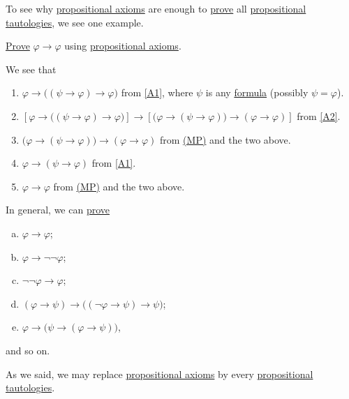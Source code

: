 To see why \hyperref[def:propositional-axioms]{propositional axioms} are enough to \hyperref[def:proof]{prove} all \hyperref[def:propositional-tautology]{propositional tautologies}, we see one example.

\begin{problem*}\label{prb:lec6}
	\hyperref[def:proof]{Prove} \(\varphi \to \varphi \) using \hyperref[def:propositional-axioms]{propositional axioms}.
\end{problem*}
\begin{answer}
	We see that
	\begin{enumerate}
		\item \(\varphi \to  \big((\psi \to \varphi ) \to \varphi \big)\) from \autoref{A1}, where \(\psi \) is any \hyperref[def:formula]{formula} (possibly \(\psi =\varphi \)).
		\item \(\left[ \varphi \to \big((\psi \to \varphi) \to \varphi \big) \right] \to  \left[ \big(\varphi \to (\psi \to \varphi )\big) \to (\varphi \to \varphi ) \right] \) from \autoref{A2}.
		\item \(\big(\varphi \to (\psi \to \varphi )\big) \to (\varphi \to \varphi )\) from \hyperref[def:rule-of-inference]{(MP)} and the two above.
		\item \(\varphi \to (\psi \to \varphi )\) from \autoref{A1}.
		\item \(\varphi \to \varphi \) from \hyperref[def:rule-of-inference]{(MP)} and the two above.
	\end{enumerate}
\end{answer}

In general, we can \hyperref[def:proof]{prove}
\begin{multicols}{2}
	\begin{enumerate}[(a)]
		\item \(\varphi \to \varphi \);
		\item \(\varphi \to \lnot \lnot \varphi \);
		\item \(\lnot \lnot \varphi \to \varphi \);
		\item \((\varphi \to \psi ) \to  \big((\lnot \varphi \to \psi ) \to \psi \big)\);
		\item \(\varphi \to \big(\psi \to (\varphi \to \psi )\big)\),
	\end{enumerate}
\end{multicols}
and so on.

\begin{note}
	As we said, we may replace \hyperref[def:propositional-axioms]{propositional axioms} by every \hyperref[def:propositional-tautology]{propositional tautologies}.
\end{note}

